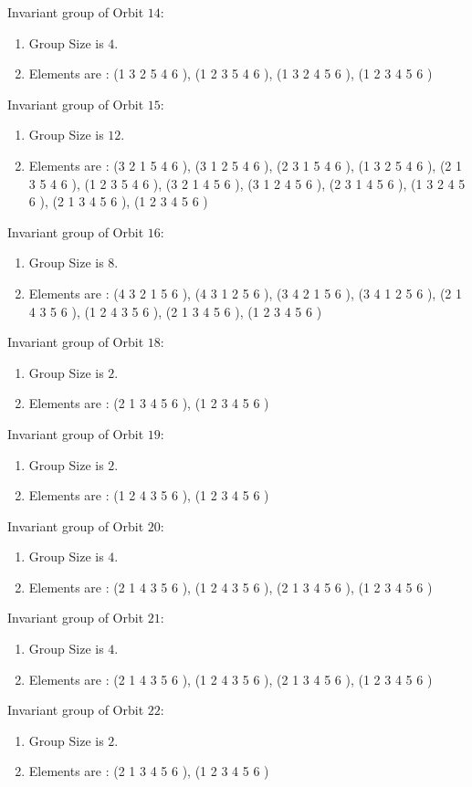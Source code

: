 \documentclass[12pt]{article}
\begin{document}
Invariant group of Orbit $14$:
\begin{enumerate}
\item Group Size is $4$.
\item Elements are : (1 3 2 5 4 6  ), (1 2 3 5 4 6  ), (1 3 2 4 5 6  ), (1 2 3 4 5 6  )
\end{enumerate}
Invariant group of Orbit $15$:
\begin{enumerate}
\item Group Size is $12$.
\item Elements are : (3 2 1 5 4 6  ), (3 1 2 5 4 6  ), (2 3 1 5 4 6  ), (1 3 2 5 4 6  ), (2 1 3 5 4 6  ), (1 2 3 5 4 6  ), (3 2 1 4 5 6  ), (3 1 2 4 5 6  ), (2 3 1 4 5 6  ), (1 3 2 4 5 6  ), (2 1 3 4 5 6  ), (1 2 3 4 5 6  )
\end{enumerate}
Invariant group of Orbit $16$:
\begin{enumerate}
\item Group Size is $8$.
\item Elements are : (4 3 2 1 5 6  ), (4 3 1 2 5 6  ), (3 4 2 1 5 6  ), (3 4 1 2 5 6  ), (2 1 4 3 5 6  ), (1 2 4 3 5 6  ), (2 1 3 4 5 6  ), (1 2 3 4 5 6  )
\end{enumerate}
Invariant group of Orbit $18$:
\begin{enumerate}
\item Group Size is $2$.
\item Elements are : (2 1 3 4 5 6  ), (1 2 3 4 5 6  )
\end{enumerate}
Invariant group of Orbit $19$:
\begin{enumerate}
\item Group Size is $2$.
\item Elements are : (1 2 4 3 5 6  ), (1 2 3 4 5 6  )
\end{enumerate}
Invariant group of Orbit $20$:
\begin{enumerate}
\item Group Size is $4$.
\item Elements are : (2 1 4 3 5 6  ), (1 2 4 3 5 6  ), (2 1 3 4 5 6  ), (1 2 3 4 5 6  )
\end{enumerate}
Invariant group of Orbit $21$:
\begin{enumerate}
\item Group Size is $4$.
\item Elements are : (2 1 4 3 5 6  ), (1 2 4 3 5 6  ), (2 1 3 4 5 6  ), (1 2 3 4 5 6  )
\end{enumerate}
Invariant group of Orbit $22$:
\begin{enumerate}
\item Group Size is $2$.
\item Elements are : (2 1 3 4 5 6  ), (1 2 3 4 5 6  )
\end{enumerate}
\end{document}
